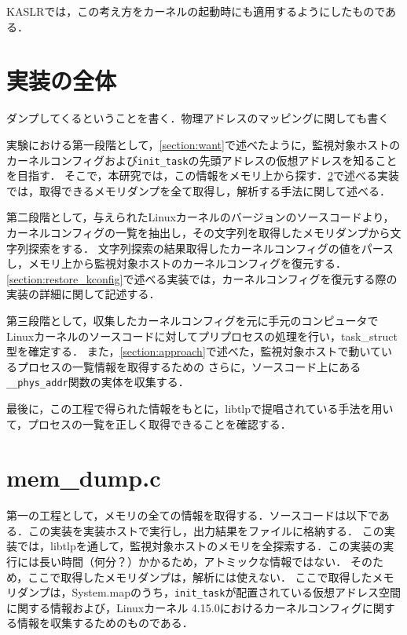KASLRでは，この考え方をカーネルの起動時にも適用するようにしたものである．



\section{実装の全体}

ダンプしてくるということを書く．物理アドレスのマッピングに関しても書く

実験における第一段階として，\ref{section:want}で述べたように，監視対象ホストのカーネルコンフィグおよび\verb|init_task|の先頭アドレスの仮想アドレスを知ることを目指す．
そこで，本研究では，この情報をメモリ上から探す．\ref{section:mem_dump}で述べる実装では，取得できるメモリダンプを全て取得し，解析する手法に関して述べる．

第二段階として，与えられたLinuxカーネルのバージョンのソースコードより，カーネルコンフィグの一覧を抽出し，その文字列を取得したメモリダンプから文字列探索をする．
文字列探索の結果取得したカーネルコンフィグの値をパースし，メモリ上から監視対象ホストのカーネルコンフィグを復元する．
\ref{section:restore_kconfig}で述べる実装では，カーネルコンフィグを復元する際の実装の詳細に関して記述する．

第三段階として，収集したカーネルコンフィグを元に手元のコンピュータでLinuxカーネルのソースコードに対してプリプロセスの処理を行い，task\_struct型を確定する．
また，\ref{section:approach}で述べた，監視対象ホストで動いているプロセスの一覧情報を取得するための
さらに，ソースコード上にある\verb|__phys_addr|関数の実体を収集する．

最後に，この工程で得られた情報をもとに，libtlpで提唱されている手法を用いて，プロセスの一覧を正しく取得できることを確認する．

\section{mem\_dump.c}
\label{section:mem_dump}

第一の工程として，メモリの全ての情報を取得する．ソースコードは以下である．この実装を実装ホストで実行し，出力結果をファイルに格納する．
この実装では，libtlpを通して，監視対象ホストのメモリを全探索する．この実装の実行には長い時間（何分？）かかるため，アトミックな情報ではない．
そのため，ここで取得したメモリダンプは，解析には使えない．
ここで取得したメモリダンプは，System.mapのうち，\verb|init_task|が配置されている仮想アドレス空間に関する情報および，Linuxカーネル 4.15.0におけるカーネルコンフィグに関する情報を収集するためのものである．

